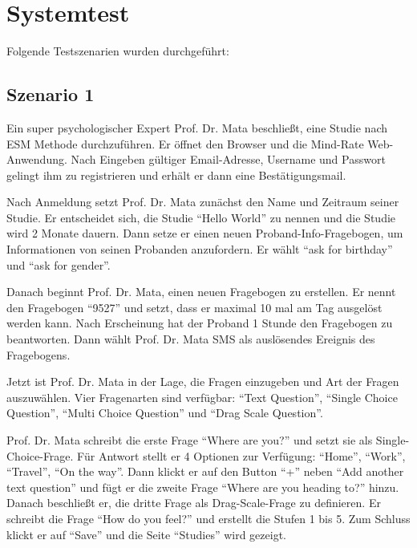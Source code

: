 \documentclass[a4paper]{scrreprt}
\begin{document}
	
	  \newpage
	  \chapter{Systemtest}
	  Folgende Testszenarien wurden durchgef\"uhrt:
	

		\section{Szenario 1}
                \par Ein super psychologischer Expert Prof. Dr. Mata beschließt, eine Studie nach ESM Methode durchzuf\"uhren. Er \"offnet den Browser und die Mind-Rate Web-Anwendung. Nach Eingeben g\"ultiger Email-Adresse, Username und Passwort gelingt ihm zu registrieren und erh\"alt er dann eine Bestätigungsmail.
                
                \par Nach Anmeldung setzt Prof. Dr. Mata zun\"achst den Name und Zeitraum seiner Studie. Er entscheidet sich, die Studie ``Hello World'' zu nennen und die Studie wird 2 Monate dauern. Dann setze er einen neuen Proband-Info-Fragebogen, um Informationen von seinen Probanden anzufordern. Er w\"ahlt ``ask for birthday'' und ``ask for gender''.
                
                \par Danach beginnt Prof. Dr. Mata, einen neuen Fragebogen zu erstellen. Er nennt den Fragebogen ``9527'' und setzt, dass er maximal 10 mal am Tag ausgel\"ost werden kann. Nach Erscheinung hat der Proband 1 Stunde den Fragebogen zu beantworten. Dann w\"ahlt Prof. Dr. Mata SMS als ausl\"osendes Ereignis des Fragebogens.
                
                \par Jetzt ist Prof. Dr. Mata in der Lage, die Fragen einzugeben und Art der Fragen auszuw\"ahlen. Vier Fragenarten sind verf\"ugbar: ``Text Question'', ``Single Choice Question'', ``Multi Choice Question'' und ``Drag Scale Question''.
                
                \par Prof. Dr. Mata schreibt die erste Frage ``Where are you?'' und setzt sie als Single-Choice-Frage. Für Antwort stellt er 4 Optionen zur Verf\"ugung: ``Home'', ``Work'', ``Travel'', ``On the way''. Dann klickt er auf den Button ``+'' neben ``Add another text question'' und f\"ugt er die zweite Frage ``Where are you heading to?'' hinzu. Danach beschließt er, die dritte Frage als Drag-Scale-Frage zu definieren. Er schreibt die Frage ``How do you feel?'' und erstellt die Stufen 1 bis 5. Zum Schluss klickt er auf ``Save'' und die Seite ``Studies'' wird gezeigt.
                
\end{document}
